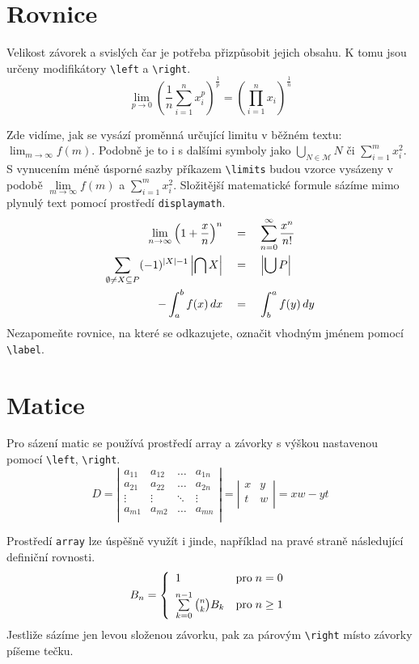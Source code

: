 \documentclass[a4paper,11pt,twocolumn]{article}
\begin{document}
\section{Rovnice}

Velikost závorek a svislých čar je potřeba přizpůsobit jejich obsahu.
K tomu jsou určeny modifikátory \verb|\left| a \verb|\right|.
\begin{equation}
\lim_{p \to 0} \left(\frac{1}{n}\sum_{i=1}^{n}x_i^p\right)^{\frac{1}{p}} = \left(\prod_{i=1}^{n} x_i\right)^{\frac{1}{n}}
\end{equation}

Zde vidíme, jak se vysází proměnná určující limitu v běžném textu: $\lim_{m \to \infty}f(m)$.
Podobně je to i s dalšími symboly jako $\bigcup_{N \in \mathcal{M}}N$ či $\sum_{i=1}^mx^2_i$.
S vynucením méně úsporné sazby příkazem \verb|\limits| budou vzorce vysázeny v podobě $\lim\limits_{m \to \infty} f(m)$ a $\sum\limits_{i=1}^{m}x^2_i$.
Složitější matematické formule sázíme mimo plynulý text pomocí prostředí \texttt{displaymath}.
\begin{align}
    \lim\limits_{n \to \infty}\left(1 + \frac{x}{n}\right)^n \quad&=\quad \sum\limits_{n=0}^{\infty}\frac{x^n}{n!}\\
    \sum\limits_{\emptyset\neq{}X\subseteq{}P}(-1)^{\left|{}X{}\right| - 1}\left|\bigcap{}X\right| \quad&=\quad \left|\bigcup{}P\right|\\
    -\int_{a}^{b} f(x) \, dx \quad&=\quad \int_{b}^{a}f(y)\empty\,dy \label{equation:7}
\end{align}
Nezapomeňte rovnice, na které se odkazujete, označit vhodným jménem pomocí \verb|\label|.


\section{Matice}

Pro sázení matic se používá prostředí array a závorky s výškou nastavenou pomocí
\verb|\left|, \verb|\right|.
\[
D = \left| 
\begin{array}{cccc}
a_{11} & a_{12} & \dots  & a_{1n} \\
a_{21} & a_{22} & \dots  & a_{2n} \\
\vdots & \vdots & \ddots & \vdots \\
a_{m1} & a_{m2} & \dots  & a_{mn} \\
\end{array} 
\right|
=
\left| 
\begin{array}{cc}
    x & y \\
    t & w \\
    \end{array} 
\right|
= xw - yt
\]

Prostředí \verb|array| lze úspěšně využít i jinde,
například na pravé straně následující definiční rovnosti.
\[
    B_n = 
    \left\{
        \begin{array}{l l}
            1 & \text{pro}\; n = 0 \\[0.5em]
            \sum\limits_{k=0}^{n-1} \binom{n}{k} B_k & \text{pro}\; n \geq 1
        \end{array}
    \right.
\]
    Jestliže sázíme jen levou složenou závorku, pak za párovým \verb|\right|
    místo závorky píšeme tečku.

    \label{page:1}
\end{document}
